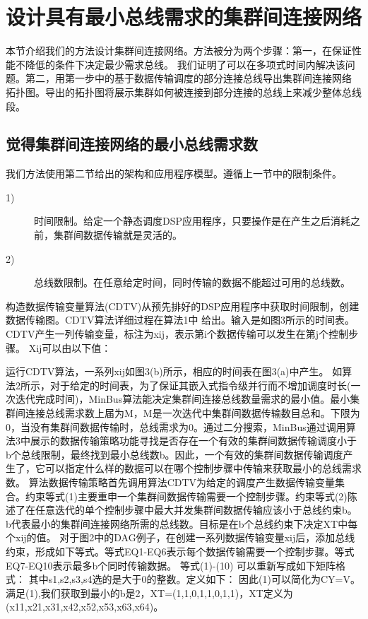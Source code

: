 \section{设计具有最小总线需求的集群间连接网络}
本节介绍我们的方法设计集群间连接网络。方法被分为两个步骤：第一，在保证性能不降低的条件下决定最少需求总线。
我们证明了可以在多项式时间内解决该问题。第二，用第一步中的基于数据传输调度的部分连接总线导出集群间连接网络
拓扑图。导出的拓扑图将展示集群如何被连接到部分连接的总线上来减少整体总线段。
\subsection{觉得集群间连接网络的最小总线需求数}
我们方法使用第二节给出的架构和应用程序模型。遵循上一节中的限制条件。
\begin{description}
  \item[1)] 时间限制。给定一个静态调度DSP应用程序，只要操作是在产生之后消耗之前，集群间数据传输就是灵活的。
      \item[2)] 总线数限制。在任意给定时间，同时传输的数据不能超过可用的总线数。
\end{description}
构造数据传输变量算法(CDTV)从预先排好的DSP应用程序中获取时间限制，创建数据传输图。CDTV算法详细过程在算法1中
给出。输入是如图3所示的时间表。CDTV产生一列传输变量，标注为xij，表示第i个数据传输可以发生在第j个控制步骤。
Xij可以由以下值：

 运行CDTV算法，一系列xij如图3(b)所示，相应的时间表在图3(a)中产生。
如算法2所示，对于给定的时间表，为了保证其嵌入式指令级并行而不增加调度时长(一次迭代完成时间)，MinBus算法能决定集群间连接总线数量需求的最小值。最小集群间连接总线需求数上届为M，M是一次迭代中集群间数据传输数目总和。下限为0，当没有集群间数据传输时，总线需求为0。通过二分搜索，MinBus通过调用算法3中展示的数据传输策略功能寻找是否存在一个有效的集群间数据传输调度小于b个总线限制，最终找到最小总线数b。因此，一个有效的集群间数据传输调度产生了，它可以指定什么样的数据可以在哪个控制步骤中传输来获取最小的总线需求数。
算法数据传输策略首先调用算法CDTV为给定的调度产生数据传输变量集合。约束等式(1)主要重申一个集群间数据传输需要一个控制步骤。约束等式(2)陈述了在任意迭代的单个控制步骤中最大并发集群间数据传输应该小于总线约束b。b代表最小的集群间连接网络所需的总线数。目标是在b个总线约束下决定XT中每个xij的值。
对于图2中的DAG例子，在创建一系列数据传输变量xij后，添加总线约束，形成如下等式。等式EQ1-EQ6表示每个数据传输需要一个控制步骤。等式EQ7-EQ10表示最多b个同时传输数据。
等式(1)-(10) 可以重新写成如下矩阵格式：
其中s1,s2,s3,s4选的是大于0的整数。定义如下：
因此(1)可以简化为CY=V。
满足(1),我们获取到最小的b是2，XT=(1,1,0,1,1,0,1,1)，XT定义为(x11,x21,x31,x42,x52,x53,x63,x64)。

